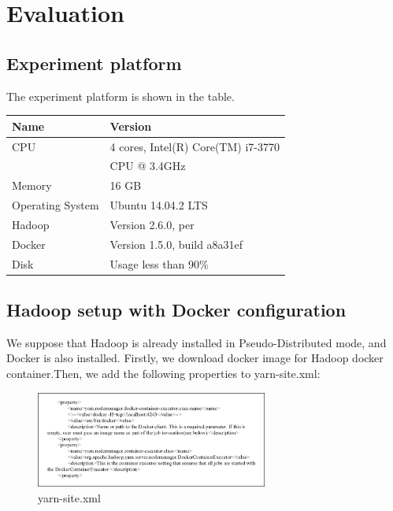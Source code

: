 \section{Evaluation}
\label{sec:eval}

\subsection{Experiment platform}

The experiment platform is shown in the table.

\begin{table}[ht]

\begin{tabular}{|l|l|}
\hline 
Name & Version \\ 
\hline 
CPU & 4 cores, Intel(R) Core(TM) i7-3770 \\
& CPU @ 3.4GHz \\ 
\hline 
Memory & 16 GB \\ 
\hline 
Operating System & Ubuntu 14.04.2 LTS \\ 
\hline 
Hadoop & Version 2.6.0, per \\ 
\hline 
Docker & Version 1.5.0, build a8a31ef \\ 
\hline 
Disk & Usage less than 90\% \\ 
\hline 
\end{tabular}
\end{table}


\subsection{Hadoop setup with Docker configuration}

We suppose that Hadoop is already installed in Pseudo-Distributed mode, and Docker is also installed. Firstly, we download docker image for Hadoop docker container.Then, we add the following properties to yarn-site.xml:

\begin{figure}[h]
  \centering
  \includegraphics[width=3in]{figs/code.eps}
  \caption{yarn-site.xml}
  \label{fig:overview}
\end{figure}

